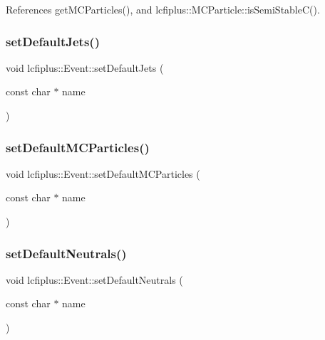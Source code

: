 References get\+M\+C\+Particles(), and lcfiplus\+::\+M\+C\+Particle\+::is\+Semi\+Stable\+C().

\mbox{\label{classlcfiplus_1_1Event_ab90cea4f3273359ffd244263fb760f71}} 
\subsubsection{set\+Default\+Jets()}
{\footnotesize\ttfamily void lcfiplus\+::\+Event\+::set\+Default\+Jets (\begin{DoxyParamCaption}\item[{const char $\ast$}]{name }\end{DoxyParamCaption})\hspace{0.3cm}{\ttfamily [inline]}}

\mbox{\label{classlcfiplus_1_1Event_ada8f2072bbe3623b101f9727c0d0b771}} 
\subsubsection{set\+Default\+M\+C\+Particles()}
{\footnotesize\ttfamily void lcfiplus\+::\+Event\+::set\+Default\+M\+C\+Particles (\begin{DoxyParamCaption}\item[{const char $\ast$}]{name }\end{DoxyParamCaption})\hspace{0.3cm}{\ttfamily [inline]}}

\mbox{\label{classlcfiplus_1_1Event_a80317cd29fa92ec7342615aee64f5cf6}} 
\subsubsection{set\+Default\+Neutrals()}
{\footnotesize\ttfamily void lcfiplus\+::\+Event\+::set\+Default\+Neutrals (\begin{DoxyParamCaption}\item[{const char $\ast$}]{name }\end{DoxyParamCaption})\hspace{0.3cm}{\ttfamily [inline]}}

